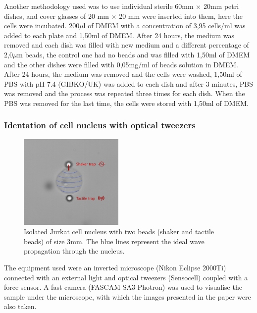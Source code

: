 \documentclass[12pt, a4paper]{article} %
\begin{document}
Another methodology used was to use individual sterile 60mm $\times$ 20mm petri dishes, and cover glasses of 20 mm $\times$ 20 mm were inserted into them, here the cells were incubated. 200$\mu$l of DMEM with a concentration of 3,95 cells/ml was added to each plate and 1,50ml of DMEM. After 24 hours, the medium was removed and each dish was filled with new medium and a different percentage of 2,0$\mu$m beads, the control one had no beads and was filled with 1,50ml of DMEM and the other dishes were filled with 0,05mg/ml of beads solution in DMEM. After 24 hours, the medium was removed and the cells were washed, 1,50ml of PBS with pH 7.4 (GIBKO/UK) was added to each dish and after 3 minutes, PBS was removed and the process was repeated three times for each dish. When the PBS was removed for the last time, the cells were stored with 1,50ml of DMEM. 

\setlength{\parskip}{0mm}

\subsubsection{Identation of cell nucleus with optical tweezers}

\begin{figure}
	\centering
	\includegraphics[width=0.45\textwidth]{figures/jurkat_nucleus_waves.png}
	\caption{Isolated Jurkat cell nucleus with two beads (shaker and tactile beads) of size 3mm. The blue lines represent the ideal wave propagation through the nucleus.}
	\label{fig:myfig2}
\end{figure}

The equipment used were an inverted microscope (Nikon Eclipse 2000Ti) connected with an external light and optical tweezers (Sensocell) coupled with a force sensor. A fast camera (FASCAM SA3-Photron) was used to visualise the sample under the microscope, with which the images presented in the paper were also taken.
\end{document}
